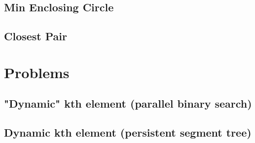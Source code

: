 \documentclass[a4paper,10pt,twocolumn,oneside]{article}
\begin{document}
\subsection{Min Enclosing Circle}

\subsection{Closest Pair}

\section{Problems}
\subsection{"Dynamic" kth element (parallel binary search)}

\subsection{Dynamic kth element (persistent segment tree)}

\end{document}

